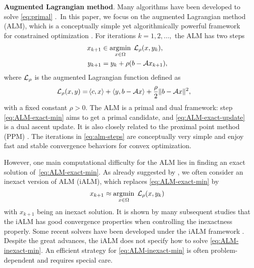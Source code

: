 \documentclass[11pt]{article}
\begin{document}
\vspace{3pt}
\noindent \textbf{Augmented Lagrangian method}. Many algorithms have been developed to solve \cref{eq:primal} \cite{wolkowicz2012handbook,zheng2021chordal}.~In this paper, we focus on the augmented Lagrangian method (ALM), which is a conceptually simple yet algorithmically powerful framework for constrained optimization \cite{rockafellar1976augmented,hestenes1969multiplier,powell1969method}. For iterations $k = 1,2,\ldots,$ the ALM has two steps
\begin{subequations}
    \label{eq:alm-steps}
    \begin{align}
        x_{k+1} & \in  \operatorname*{\arg\!\min}_{x \in \Omega}\;
        \mathcal{L}_{\rho}(x,y_k),
        \label{eq:ALM-exact-min}\\
            y_{k+1} & = y_k + \rho(b-\mathcal{A} x_{k+1}) \label{eq:ALM-exact-update},
    \end{align}
\end{subequations}
where $\mathcal{L}_\rho$ is the augmented Lagrangian function defined as 
\begin{equation}
\begin{aligned}
\label{eq:AL}
        \mathcal{L}_\rho(x,y) = & \left \langle c, x \right\rangle + \left \langle y, b-\mathcal{A} x \right\rangle + \frac{\rho}{2}\|b - \mathcal{A} x \|^2,  
\end{aligned}    
\end{equation}
with a fixed constant $\rho >0$. The ALM is a primal and dual framework: step \eqref{eq:ALM-exact-min} aims to get a primal candidate, and \eqref{eq:ALM-exact-update} is a dual ascent update. It is also closely related to the proximal point method (PPM) \cite{rockafellar1976monotone}.
The iterations in \cref{eq:alm-steps} are conceptually very simple and enjoy fast and stable convergence behaviors for convex optimization. 

However, one main computational difficulty for the ALM lies in finding an exact solution of~\eqref{eq:ALM-exact-min}. As already suggested by \cite{rockafellar1976augmented}, we often consider an inexact version of ALM (iALM), which replaces \eqref{eq:ALM-exact-min} by \vspace{-1mm}
\begin{equation}
\label{eq:ALM-inexact-min}
    x_{k+1} \approx  \operatorname*{\arg\!\min}_{x \in \Omega}\; \mathcal{L}_{\rho}(x,y_k) 
\end{equation}
with $x_{k+1}$ being an inexact solution. It is shown by many subsequent studies  \cite{luque1984asymptotic,cui2019r,xu2021iteration,liao2024inexact} that the iALM has good convergence properties when controlling the inexactness properly. Some recent solvers have been developed under the iALM framework \cite{chen2016semismooth,sun2020sdpnal+,yurtsever2019conditional}. Despite the great advances, the iALM does not specify how to solve \eqref{eq:ALM-inexact-min}. An efficient strategy for \cref{eq:ALM-inexact-min} is often problem-dependent and requires special care. 
\end{document}
